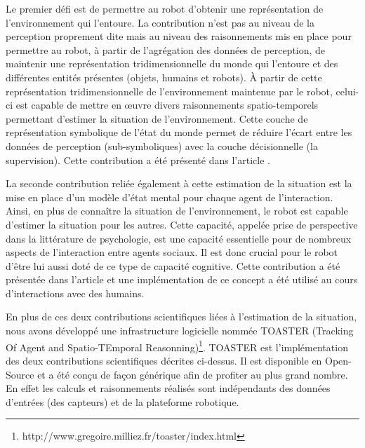 \documentclass[a4paper,11pt,twoside]{StyleThese}
\begin{document}
Le premier défi est de permettre au robot d'obtenir une représentation de l'environnement qui l'entoure. La contribution n'est pas au niveau de la perception proprement dite mais au niveau des raisonnements mis en place pour permettre au robot, à partir de l'agrégation des données de perception, de maintenir une représentation tridimensionnelle du monde qui l'entoure et des différentes entités présentes (objets, humains et robots). À partir de cette représentation tridimensionnelle de l'environnement maintenue par le robot, celui-ci est capable  de mettre en œuvre divers raisonnements spatio-temporels permettant d'estimer la situation de l'environnement. Cette couche de représentation symbolique de l'état du monde permet de réduire l'écart entre les données de perception (sub-symboliques) avec la couche décisionnelle (la supervision). Cette contribution a été présenté dans l'article \cite{Milliez2014}.

La seconde contribution reliée également à cette estimation de la situation est la mise en place d'un modèle d'état mental pour chaque agent de l'interaction. Ainsi, en plus de connaître la situation de l'environnement, le robot est capable d'estimer la situation pour les autres. Cette capacité, appelée prise de perspective dans la littérature de psychologie, est une capacité essentielle pour de nombreux aspects de l'interaction entre agents sociaux. Il est donc crucial pour le robot d'être lui aussi doté de ce type de capacité cognitive. Cette contribution a été présentée dans l'article \cite{Milliez2014} et une implémentation de ce  concept a été utilisé au cours d'interactions avec des humains. 

En plus de ces deux contributions scientifiques liées à l'estimation de la situation, nous avons développé une infrastructure logicielle nommée TOASTER (Tracking Of Agent and Spatio-TEmporal Reasonning)\footnote{http://www.gregoire.milliez.fr/toaster/index.html}. TOASTER est l'implémentation des deux contributions scientifiques décrites ci-dessus. Il est disponible en Open-Source et a été conçu de façon générique afin de profiter au plus grand nombre. En effet les calculs et raisonnements réalisés sont indépendants des données d'entrées (des capteurs) et de la plateforme robotique.
\end{document}
